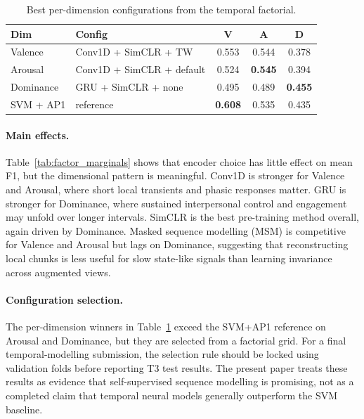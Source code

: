 \documentclass[sigconf,review,anonymous]{acmart}
\newcommand{\best}[1]{\textbf{\textcolor{bestcol}{#1}}}
\begin{document}
\begin{table}[t]
\caption{Best per-dimension configurations from the temporal factorial.}
\label{tab:factorial}
\centering
\setlength{\tabcolsep}{3.5pt}
\small
\begin{tabular}{llccc}
\toprule
\textbf{Dim} & \textbf{Config} & \textbf{V} & \textbf{A} & \textbf{D} \\
\midrule
Valence & Conv1D + SimCLR + TW      & 0.553 & 0.544 & 0.378 \\
Arousal & Conv1D + SimCLR + default & 0.524 & \best{0.545} & 0.394 \\
Dominance & GRU + SimCLR + none     & 0.495 & 0.489 & \best{0.455} \\
\midrule
SVM + AP1 & reference               & \best{0.608} & 0.535 & 0.435 \\
\bottomrule
\end{tabular}
\end{table}

\paragraph{Main effects.}
Table~\ref{tab:factor_marginals} shows that encoder choice has little effect
on mean F1, but the dimensional pattern is meaningful.
Conv1D is stronger for Valence and Arousal, where short local transients and
phasic responses matter.
GRU is stronger for Dominance, where sustained interpersonal control and
engagement may unfold over longer intervals.
SimCLR is the best pre-training method overall, again driven by Dominance.
Masked sequence modelling (MSM) is competitive for Valence and Arousal but
lags on Dominance, suggesting that reconstructing local chunks is less useful
for slow state-like signals than learning invariance across augmented views.

\paragraph{Configuration selection.}
The per-dimension winners in Table~\ref{tab:factorial} exceed the SVM+AP1
reference on Arousal and Dominance, but they are selected from a factorial
grid.
For a final temporal-modelling submission, the selection rule should be locked
using validation folds before reporting T3 test results.
The present paper treats these results as evidence that self-supervised
sequence modelling is promising, not as a completed claim that temporal neural
models generally outperform the SVM baseline.
\end{document}
